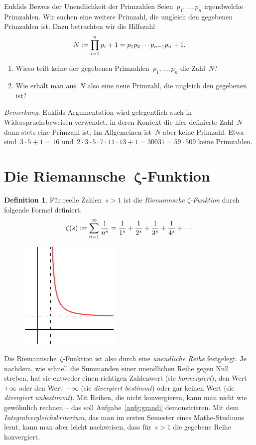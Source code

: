 \documentclass[twoside]{../zirkelblatt1415}
\theoremstyle{definition}
\newtheorem{defn}{Definition}[section]
\theoremstyle{plain}
\theoremstyle{remark}
\newcommand{\defeq}{\vcentcolon=}
\begin{document}
\begin{aufgabe}{Euklids Beweis der Unendlichkeit der Primzahlen}
\label{aufg:unendlich-euklid}
Seien~$p_1,\ldots,p_n$ irgendwelche Primzahlen. Wir suchen eine weitere
Primzahl, die ungleich den gegebenen Primzahlen ist. Dazu betrachten wir die
Hilfszahl
\[ N \defeq \prod_{i=1}^n p_i + 1 = p_1 p_2 \cdots p_{n-1} p_n + 1. \]
\begin{enumerate}
\item Wieso teilt keine der gegebenen Primzahlen~$p_1,\ldots,p_n$ die Zahl~$N$?
\item Wie erhält man aus~$N$ also eine neue Primzahl, die ungleich den
gegebenen ist?
\end{enumerate}

\emph{Bemerkung.} Euklids Argumentation wird gelegentlich auch in
Widerspruchsbeweisen verwendet, in deren Kontext die hier definierte Zahl~$N$
dann stets eine Primzahl ist. Im Allgemeinen ist~$N$ aber keine Primzahl. Etwa
sind~$3 \cdot 5 + 1 = 16$ und~$2 \cdot 3 \cdot 5 \cdot 7 \cdot 11 \cdot 13 + 1
= 30031 = 59 \cdot 509$ keine Primzahlen.
\end{aufgabe}


\section{Die Riemannsche~$\boldsymbol{\zeta}$-Funktion}

\begin{defn}Für reelle Zahlen~$s > 1$ ist die \emph{Riemannsche
$\zeta$-Funktion} durch folgende Formel definiert.
\[ \zeta(s) \defeq \sum_{n=1}^\infty \frac{1}{n^s} =
  \frac{1}{1^s} + \frac{1}{2^s} + \frac{1}{3^s} + \frac{1}{4^s} + \cdots \]
\end{defn}

\setlength{\wrapoverhang}{1cm}
\setlength{\columnsep}{0.5cm}
\begin{figure}
\vspace{-4em}
\includegraphics[scale=1]{zeta-function-real}
\end{figure}
Die Riemannsche~$\zeta$-Funktion ist also durch eine \emph{unendliche Reihe}
festgelegt. Je nachdem, wie schnell die Summanden einer unendlichen Reihe gegen
Null streben, hat sie entweder einen richtigen Zahlenwert (sie
\emph{konvergiert}), den Wert~$+\infty$ oder den Wert~$-\infty$ (sie
\emph{divergiert bestimmt}) oder gar keinen Wert (sie \emph{divergiert
unbestimmt}). Mit Reihen, die nicht konvergieren, kann man nicht wie gewöhnlich
rechnen -- das soll Aufgabe~\ref{aufg:grandi} demonstrieren. Mit dem
\emph{Integralvergleichskriterium}, das man im ersten Semester eines
Mathe-Studiums lernt, kann man aber leicht nachweisen, dass für~$s > 1$ die
gegebene Reihe konvergiert.
\end{document}
